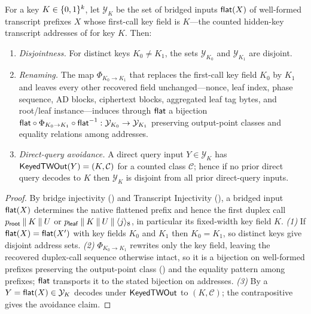 \begin{lemma}
\label{lem:key-renaming}
For a key $K \in \{0,1\}^k$, let $\mathcal{Y}_K$ be the set of bridged
inputs $\mathsf{flat}(X)$ of well-formed \TW{} transcript prefixes $X$ whose
first-call key field is $K$---the counted hidden-key transcript addresses
of  for key $K$. Then:
\begin{enumerate}
\item \emph{Disjointness.} For distinct keys $K_0 \neq K_1$, the sets
  $\mathcal{Y}_{K_0}$ and $\mathcal{Y}_{K_1}$ are disjoint.
\item \emph{Renaming.} The map $\Phi_{K_0 \to K_1}$ that replaces the
  first-call key field $K_0$ by $K_1$ and leaves every other recovered
  field unchanged---nonce, leaf index, phase sequence, AD blocks,
  ciphertext blocks, aggregated leaf tag bytes, and root/leaf
  instance---induces through $\mathsf{flat}$ a bijection
  $\mathsf{flat} \circ \Phi_{K_0 \to K_1} \circ \mathsf{flat}^{-1} :
  \mathcal{Y}_{K_0} \to \mathcal{Y}_{K_1}$ preserving output-point
  classes and equality relations among addresses.
\item \emph{Direct-query avoidance.} A direct query input
  $Y \in \mathcal{Y}_K$ has $\mathsf{KeyedTWOut}(Y) = (K,\mathcal{C})$ for a
  counted class $\mathcal{C}$; hence if no prior direct query decodes to
  $K$ then $\mathcal{Y}_K$ is disjoint from all prior direct-query
  inputs.
\end{enumerate}
\end{lemma}

\begin{proof}
By bridge injectivity () and Transcript
Injectivity (), a bridged input $\mathsf{flat}(X)$
determines the native flattened prefix and hence the first duplex call
$p_{\mathsf{root}} \mathbin{\|} K \mathbin{\|} U$ or
$p_{\mathsf{leaf}} \mathbin{\|} K \mathbin{\|} U \mathbin{\|} \langle j \rangle_8$, in
particular its fixed-width key field $K$. \emph{(1)} If
$\mathsf{flat}(X) = \mathsf{flat}(X')$ with key fields $K_0$ and $K_1$ then
$K_0 = K_1$, so distinct keys give disjoint address sets. \emph{(2)}
$\Phi_{K_0 \to K_1}$ rewrites only the key field, leaving the recovered
duplex-call sequence otherwise intact, so it is a bijection on
well-formed prefixes preserving the output-point class
() and the equality pattern among prefixes;
$\mathsf{flat}$ transports it to the stated bijection on addresses. \emph{(3)}
By  a $Y = \mathsf{flat}(X) \in \mathcal{Y}_K$ decodes
under $\mathsf{KeyedTWOut}$ to $(K,\mathcal{C})$; the contrapositive gives the
avoidance claim.
\end{proof}

